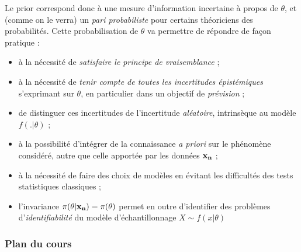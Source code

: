 Le prior correspond donc à une mesure d'information incertaine à propos de $\theta$, et (comme on le verra) un \emph{pari probabiliste} pour certains théoriciens des probabilités. Cette probabilisation de $\theta$ va permettre de répondre de fa\c con pratique :
\begin{itemize}
\item  à la nécessité de \emph{satisfaire le principe de vraisemblance} ;
\item   à la nécessité de \emph{tenir compte de toutes les incertitudes épistémiques} s'exprimant sur $\theta$, en particulier dans un objectif de \emph{prévision} ;
\item  de distinguer ces incertitudes de l'incertitude \emph{aléatoire}, intrinsèque au modèle $f(.|\theta)$ ;
\item  à la possibilité d'intégrer de la connaissance {\it a priori} sur le phénomène considéré, autre que celle apportée par les données ${\bf x_n}$ ;
\item à la nécessité de faire des choix de modèles en évitant les difficultés des tests statistiques classiques ; 
\item  l'invariance $\pi(\theta|{\bf x_n})=\pi(\theta)$ permet en outre d'identifier des problèmes d'\emph{identifiabilité} du modèle d'échantillonnage $X\sim f(x|\theta)$
\end{itemize}

\subsubsection{Plan du cours}

